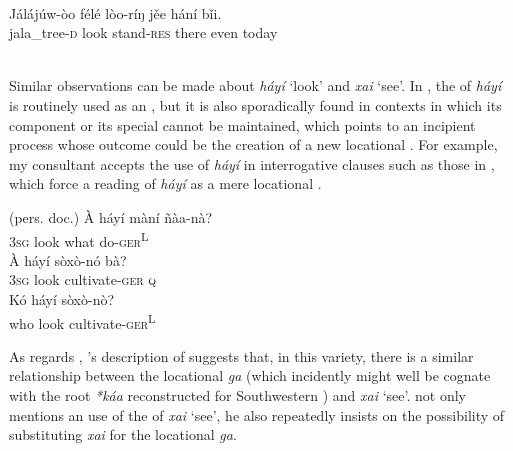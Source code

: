 \documentclass[output=paper]{langsci/langscibook}
\begin{document}
  \ea%
    \label{ex:creissels:13}
\\
   \gll Jálájúw-òo félé lòo-ríŋ jěe hání bǐi.\\
     jala\_tree-\textsc{d}  look  stand-\textsc{res}  there  even  today\\
  \\ 
\z

Similar observations can be made about  \textit{háyí} ‘look’ and  \textit{xai} ‘see’. In , the  of \textit{háyí} is routinely used as an  , but it is also sporadically found in contexts in which its  component or its special  cannot be maintained, which points to an incipient process whose outcome could be the creation of a new locational . For example, my  consultant accepts the use of \textit{háyí} in interrogative clauses such as those in , which force a reading of \textit{háyí} as a mere locational . 

\ea%
    \label{ex:creissels:14}   
   (pers. doc.)    
   \ea
    \gll   À  háyí  màní  ñàa-nà?\\
       \textsc{3sg}  look  what  do-\textsc{ger}\textsuperscript{\tiny L}\\
   \ex
    \gll   À  háyí  sòxò-nó  bà?\\
       \textsc{3sg}  look  cultivate-\textsc{ger}  \textsc{q}\\
   \ex
    \gll   Kó  háyí  sòxò-nò?\\
       who  look  cultivate-\textsc{ger}\textsuperscript{\tiny L}\\
\z
\z


As regards , \citeauthor{Blecke1996}’s description of  suggests that, in this  variety, there is a similar relationship between the locational  \textit{ga} (which incidently might well be cognate with the root \textit{*káa} reconstructed for Southwestern ) and \textit{xai} ‘see’. \citet[206 et seq.]{Blecke1996} not only mentions an  use of the  of \textit{xai} ‘see’, he also repeatedly insists on the possibility of substituting \textit{xai} for the locational  \textit{ga}.
\end{document}
